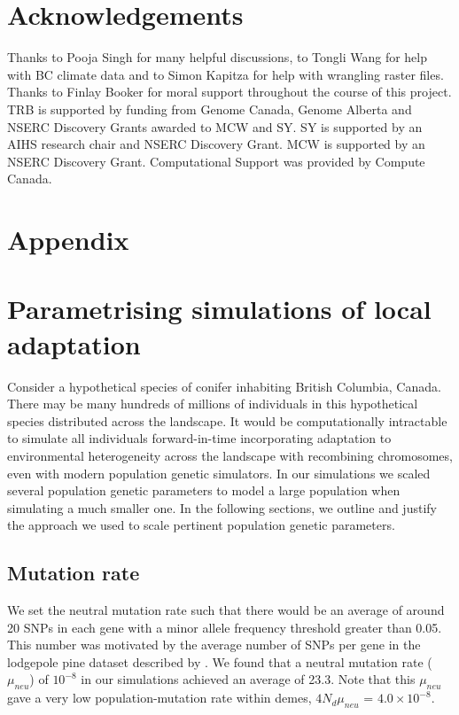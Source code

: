 \documentclass[10pt,twoside,lineno]{GSA_format}
\newcommand{\beginsupplement}{%
        \setcounter{table}{0}
        \renewcommand{\thetable}{S\arabic{table}}%
        \setcounter{figure}{0}        \renewcommand{\thefigure}{S\arabic{figure}}%
     }
\begin{document}
\section{Acknowledgements}

Thanks to Pooja Singh for many helpful discussions, to Tongli Wang for help with BC climate data and to Simon Kapitza for help with wrangling raster files. Thanks to Finlay Booker for moral support throughout the course of this project. TRB is supported by funding from Genome Canada, Genome Alberta and NSERC Discovery Grants awarded to MCW and SY. SY is supported by an AIHS research chair and NSERC Discovery Grant. MCW is supported by an NSERC Discovery Grant. Computational Support was provided by Compute Canada.\\



\beginsupplement
\onecolumn
\section{Appendix}

\section{Parametrising simulations of local adaptation}
Consider a hypothetical species of conifer inhabiting British Columbia, Canada. There may be many hundreds of millions of individuals in this hypothetical species distributed across the landscape. It would be computationally intractable to simulate all individuals forward-in-time incorporating adaptation to environmental heterogeneity across the landscape with recombining chromosomes, even with modern population genetic simulators. In our simulations we scaled several population genetic parameters to model a large population when simulating a much smaller one. In the following sections, we outline and justify the approach we used to scale pertinent population genetic parameters. 

\subsection{Mutation rate} 

We set the neutral mutation rate such that there would be an average of around 20 SNPs in each gene with a minor allele frequency threshold greater than 0.05. This number was motivated by the average number of SNPs per gene in the lodgepole pine dataset described by \cite{Yeaman2016}. We found that a neutral mutation rate ($\mu_{neu}$) of $10^{-8}$ in our simulations achieved an average of 23.3. Note that this $\mu_{neu}$ gave a very low population-mutation rate within demes, $4N_d\mu_{neu}$ = $4.0 \times 10^{-8}$.
\end{document}
